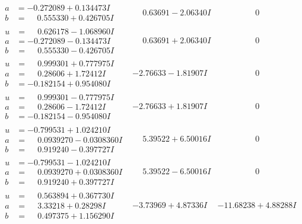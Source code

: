\documentclass[1p]{elsarticle_modified}
\theoremstyle{definition}
\begin{document}
$$\begin{array}{c|c|c}
\begin{aligned}
a &= -0.272089 + 0.134473 I \\
b &= \phantom{-}0.555330 + 0.426705 I\end{aligned}
 & \phantom{-}0.63691 - 2.06340 I & \phantom{-0.000000 } 0 \\ \hline\begin{aligned}
u &= \phantom{-}0.626178 - 1.068960 I \\
a &= -0.272089 - 0.134473 I \\
b &= \phantom{-}0.555330 - 0.426705 I\end{aligned}
 & \phantom{-}0.63691 + 2.06340 I & \phantom{-0.000000 } 0 \\ \hline\begin{aligned}
u &= \phantom{-}0.999301 + 0.777975 I \\
a &= \phantom{-}0.28606 + 1.72412 I \\
b &= -0.182154 + 0.954080 I\end{aligned}
 & -2.76633 - 1.81907 I & \phantom{-0.000000 } 0 \\ \hline\begin{aligned}
u &= \phantom{-}0.999301 - 0.777975 I \\
a &= \phantom{-}0.28606 - 1.72412 I \\
b &= -0.182154 - 0.954080 I\end{aligned}
 & -2.76633 + 1.81907 I & \phantom{-0.000000 } 0 \\ \hline\begin{aligned}
u &= -0.799531 + 1.024210 I \\
a &= \phantom{-}0.0939270 - 0.0308360 I \\
b &= \phantom{-}0.919240 - 0.397727 I\end{aligned}
 & \phantom{-}5.39522 + 6.50016 I & \phantom{-0.000000 } 0 \\ \hline\begin{aligned}
u &= -0.799531 - 1.024210 I \\
a &= \phantom{-}0.0939270 + 0.0308360 I \\
b &= \phantom{-}0.919240 + 0.397727 I\end{aligned}
 & \phantom{-}5.39522 - 6.50016 I & \phantom{-0.000000 } 0 \\ \hline\begin{aligned}
u &= \phantom{-}0.563894 + 0.367730 I \\
a &= \phantom{-}3.33218 + 0.28298 I \\
b &= \phantom{-}0.497375 + 1.156290 I\end{aligned}
 & -3.73969 + 4.87336 I & -11.68238 + 4.88288 I \\ \hline\begin{aligned}

\end{aligned}
\end{array}$$
\end{document}
